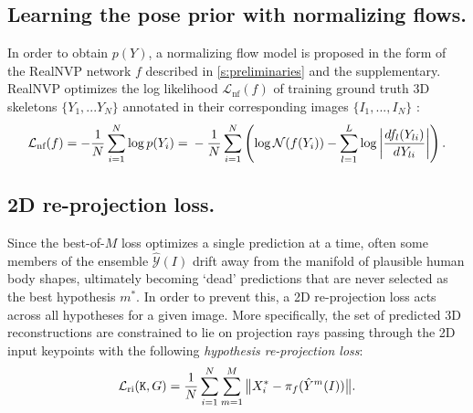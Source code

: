 
\subsection{Learning the pose prior with normalizing flows.}
In order to obtain $p(Y)$, a normalizing flow model is proposed in the form of the RealNVP network $f$ described in \cref{s:preliminaries} and the supplementary. RealNVP optimizes the log likelihood $\mathcal{L}_\text{nf}(f)$ of training ground truth 3D skeletons $\{Y_1, ... Y_N\}$ annotated in their corresponding images $\{I_1, ..., I_N\}$ :
\begin{equation}\label{e:loglik}
\mathcal{L}_\text{nf}(f)
=
-
\frac{1}{N}
\sum_{i=1}^N
\log p(Y_i)
=\\
-
\frac{1}{N}
\sum_{i=1}^N
\left(
\log \mathcal{N}(f(Y_i))
-
\sum_{l=1}^L
\log
\left|
\frac{d f_l(Y_{li})}{d Y_{li}}
\right|
\right).
\end{equation}

\subsection{2D re-projection loss.}

Since the best-of-$M$ loss optimizes a single prediction at a time, often some members of the ensemble $\mathcal{\hat Y}(I)$ drift away from the manifold of plausible human body shapes, ultimately becoming `dead' predictions that are never selected as the best hypothesis $m^*$.
In order to prevent this, a 2D re-projection loss acts across all hypotheses for a given image.
More specifically, the set of predicted 3D reconstructions are constrained to lie on projection rays passing through the 2D input keypoints with the following \emph{hypothesis re-projection loss}:
\begin{equation}\label{e:loss-ri}
  \mathcal{L}_\text{ri}(\mathtt{K},G)
  =
  \frac{1}{N}
  \sum_{i=1}^N
  \sum_{m=1}^M
  \big \| X^*_i - \pi_{f}(\hat Y^m(I)) \big \|.
\end{equation}


